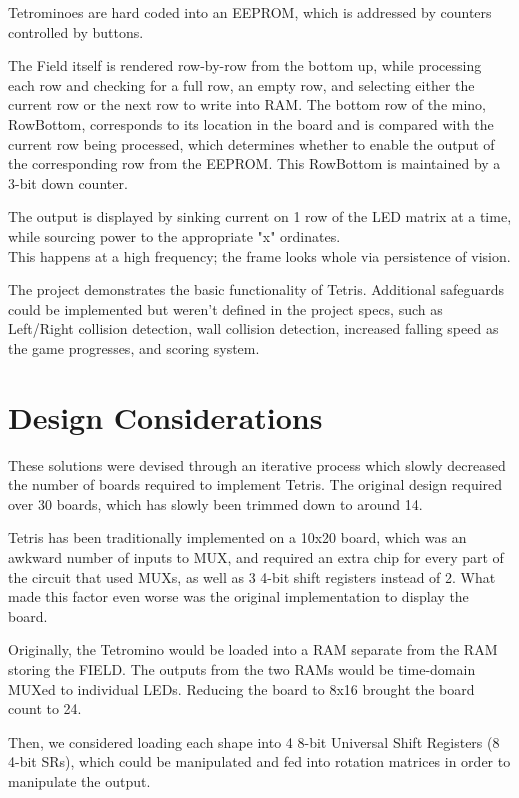 \documentclass[letterpaper,titlepage,oneside]{article}
\begin{document}
Tetrominoes are hard coded into an EEPROM, which is addressed by counters controlled by buttons.

The Field itself is rendered row-by-row from the bottom up, while processing each row and checking for a full row, an empty row, and selecting either the current row or the next row to write into RAM. The bottom row of the mino, RowBottom, corresponds to its location in the board and is compared with the current row being processed, which determines whether to enable the output of the corresponding row from the EEPROM. This RowBottom is maintained by a 3-bit down counter.

The output is displayed by sinking current on 1 row of the LED matrix at a time, while sourcing power to the appropriate "x" ordinates. \\
This happens at a high frequency; the frame looks whole via persistence of vision.

The project demonstrates the basic functionality of Tetris. Additional safeguards could be implemented but weren't defined in the project specs, such as Left/Right collision detection, wall collision detection, increased falling speed as the game progresses, and scoring system.
\pagebreak
\section{Design Considerations}

These solutions were devised through an iterative process which slowly decreased the number of boards required to implement Tetris. The original design required over 30 boards, which has slowly been trimmed down to around 14. 

Tetris has been traditionally implemented on a 10x20 board, which was an awkward number of inputs to MUX, and required an extra chip for every part of the circuit that used MUXs, as well as 3 4-bit shift registers instead of 2. What made this factor even worse was the original implementation to display the board.

Originally, the Tetromino would be loaded into a RAM separate from the RAM storing the FIELD. The outputs from the two RAMs would be time-domain MUXed to individual LEDs. Reducing the board to 8x16 brought the board count to 24. 

Then, we considered loading each shape into 4 8-bit Universal Shift Registers (8 4-bit SRs), which could be manipulated and fed into rotation matrices in order to manipulate the output. 
\end{document}
